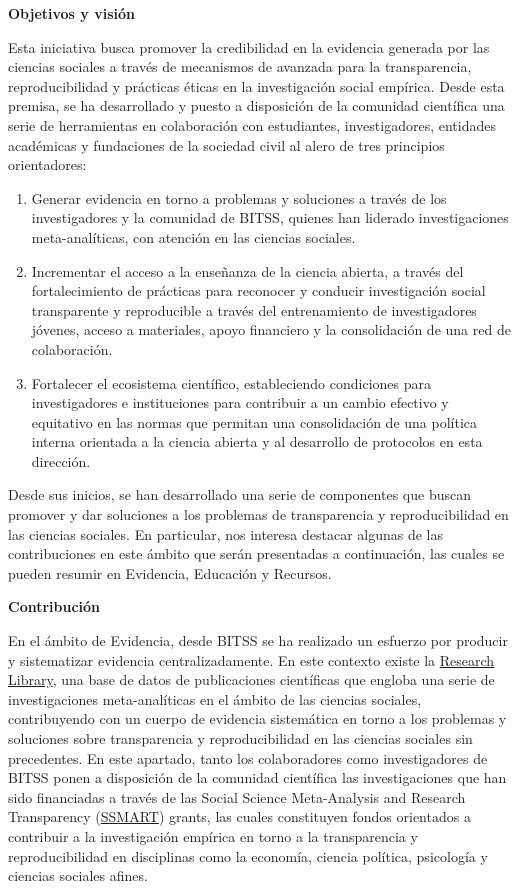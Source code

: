 \documentclass[
  spanish,
  a4paper,
  oneside]{scrbook}
\begin{document}
\textbf{Objetivos y visión}

Esta iniciativa busca promover la credibilidad en la evidencia generada
por las ciencias sociales a través de mecanismos de avanzada para la
transparencia, reproducibilidad y prácticas éticas en la investigación
social empírica. Desde esta premisa, se ha desarrollado y puesto a
disposición de la comunidad científica una serie de herramientas en
colaboración con estudiantes, investigadores, entidades académicas y
fundaciones de la sociedad civil al alero de tres principios
orientadores:

\begin{enumerate}
\def\labelenumi{\arabic{enumi}.}
\item
  Generar evidencia en torno a problemas y soluciones a través de los
  investigadores y la comunidad de BITSS, quienes han liderado
  investigaciones meta-analíticas, con atención en las ciencias
  sociales.
\item
  Incrementar el acceso a la enseñanza de la ciencia abierta, a través
  del fortalecimiento de prácticas para reconocer y conducir
  investigación social transparente y reproducible a través del
  entrenamiento de investigadores jóvenes, acceso a materiales, apoyo
  financiero y la consolidación de una red de colaboración.
\item
  Fortalecer el ecosistema científico, estableciendo condiciones para
  investigadores e instituciones para contribuir a un cambio efectivo y
  equitativo en las normas que permitan una consolidación de una
  política interna orientada a la ciencia abierta y al desarrollo de
  protocolos en esta dirección.
\end{enumerate}

Desde sus inicios, se han desarrollado una serie de componentes que
buscan promover y dar soluciones a los problemas de transparencia y
reproducibilidad en las ciencias sociales. En particular, nos interesa
destacar algunas de las contribuciones en este ámbito que serán
presentadas a continuación, las cuales se pueden resumir en Evidencia,
Educación y Recursos.

\textbf{Contribución}

En el ámbito de Evidencia, desde BITSS se ha realizado un esfuerzo por
producir y sistematizar evidencia centralizadamente. En este contexto
existe la \href{https://www.bitss.org/research-library/}{Research
Library}, una base de datos de publicaciones científicas que engloba una
serie de investigaciones meta-analíticas en el ámbito de las ciencias
sociales, contribuyendo con un cuerpo de evidencia sistemática en torno
a los problemas y soluciones sobre transparencia y reproducibilidad en
las ciencias sociales sin precedentes. En este apartado, tanto los
colaboradores como investigadores de BITSS ponen a disposición de la
comunidad científica las investigaciones que han sido financiadas a
través de las Social Science Meta-Analysis and Research Transparency
(\href{https://www.bitss.org/ssmart-grants/}{SSMART}) grants, las cuales
constituyen fondos orientados a contribuir a la investigación empírica
en torno a la transparencia y reproducibilidad en disciplinas como la
economía, ciencia política, psicología y ciencias sociales afines.
\end{document}
